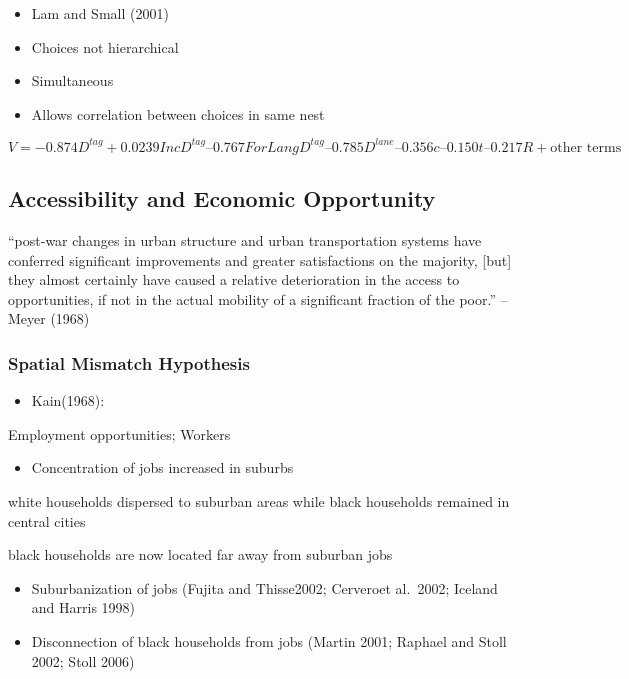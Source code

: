 \documentclass[]{article}
\providecommand{\tightlist}{%
  \setlength{\itemsep}{0pt}\setlength{\parskip}{0pt}}
\begin{document}
\begin{itemize}
\item
  Lam and Small (2001)
\item
  Choices not hierarchical
\item
  Simultaneous
\item
  Allows correlation between choices in same nest
\end{itemize}

\[V = -0.874 D^{tag}+ 0.0239 IncD^{tag}–0.767 ForLangD^{tag}–0.785 D^{lane}–0.356c –0.150t –0.217R + \text{other terms}\]

\hypertarget{accessibility-and-economic-opportunity}{%
\subsection{Accessibility and Economic
Opportunity}\label{accessibility-and-economic-opportunity}}

``post-war changes in urban structure and urban transportation systems
have conferred significant improvements and greater satisfactions on the
majority, {[}but{]} they almost certainly have caused a relative
deterioration in the access to opportunities, if not in the actual
mobility of a significant fraction of the poor.'' --Meyer (1968)

\hypertarget{spatial-mismatch-hypothesis}{%
\subsubsection{Spatial Mismatch
Hypothesis}\label{spatial-mismatch-hypothesis}}

\begin{itemize}
\tightlist
\item
  Kain(1968):
\end{itemize}

Employment opportunities; Workers

\begin{itemize}
\tightlist
\item
  Concentration of jobs increased in suburbs
\end{itemize}

white households dispersed to suburban areas while black households
remained in central cities

black households are now located far away from suburban jobs

\begin{itemize}
\item
  Suburbanization of jobs (Fujita and Thisse2002; Cerveroet al.~2002;
  Iceland and Harris 1998)
\item
  Disconnection of black households from jobs (Martin 2001; Raphael and
  Stoll 2002; Stoll 2006)
\end{itemize}
\end{document}
